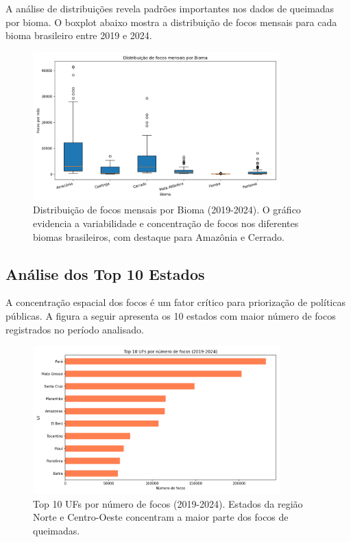 \documentclass[12pt,a4paper]{report}
\begin{document}
A análise de distribuições revela padrões importantes nos dados de queimadas por bioma. O boxplot abaixo mostra a distribuição de focos mensais para cada bioma brasileiro entre 2019 e 2024.

\begin{figure}[h]
\centering
\includegraphics[width=0.85\textwidth]{figs/eda/boxplot_bioma.png}
\caption{Distribuição de focos mensais por Bioma (2019-2024). O gráfico evidencia a variabilidade e concentração de focos nos diferentes biomas brasileiros, com destaque para Amazônia e Cerrado.}
\label{fig:boxplot_bioma}
\end{figure}

\subsection{Análise dos Top 10 Estados}

A concentração espacial dos focos é um fator crítico para priorização de políticas públicas. A figura a seguir apresenta os 10 estados com maior número de focos registrados no período analisado.

\begin{figure}[h]
\centering
\includegraphics[width=0.85\textwidth]{figs/eda/top10_uf.png}
\caption{Top 10 UFs por número de focos (2019-2024). Estados da região Norte e Centro-Oeste concentram a maior parte dos focos de queimadas.}
\label{fig:top10_uf}
\end{figure}
\end{document}
